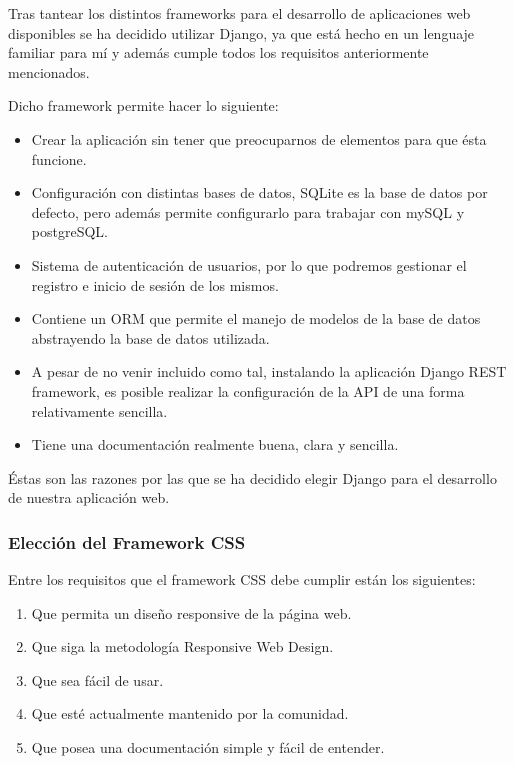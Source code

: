     Tras tantear los distintos frameworks para el desarrollo de aplicaciones web disponibles
    se ha decidido utilizar Django, ya que está hecho en un lenguaje familiar para mí y
    además cumple todos los requisitos anteriormente mencionados.

    Dicho framework permite hacer lo siguiente:
        
        \begin{itemize}
            \item Crear la aplicación sin tener que preocuparnos de elementos para que
            ésta funcione.
            \item Configuración con distintas bases de datos, SQLite es la base de datos
            por defecto, pero además permite configurarlo para trabajar con mySQL y
            postgreSQL.
            \item Sistema de autenticación de usuarios, por lo que podremos gestionar el
            registro e inicio de sesión de los mismos.
            \item Contiene un ORM que permite el manejo de modelos de la base de datos
            abstrayendo la base de datos utilizada.
            \item A pesar de no venir incluido como tal, instalando la aplicación Django
            REST framework, es posible realizar la configuración de la API de una forma
            relativamente sencilla.
            \item Tiene una documentación realmente buena, clara y sencilla.
        \end{itemize}
    
    Éstas son las razones por las que se ha decidido elegir Django para el desarrollo de
    nuestra aplicación web.

    \subsubsection{Elección del Framework CSS}
    Entre los requisitos que el framework CSS debe cumplir están los siguientes:

        \begin{enumerate}
            \item Que permita un diseño responsive de la página web.
            \item Que siga la metodología Responsive Web Design.
            \item Que sea fácil de usar.
            \item Que esté actualmente mantenido por la comunidad.
            \item Que posea una documentación simple y fácil de entender. 
        \end{enumerate}

